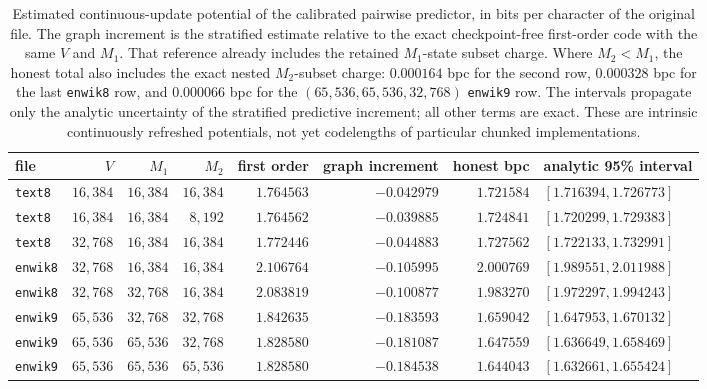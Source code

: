 \documentclass[11pt]{article}
\begin{document}
\begin{table}[ht]
\centering
\small
\setlength{\tabcolsep}{3.5pt}
\begin{tabular}{lrrrrrrl}
\toprule
file & $V$ & $M_1$ & $M_2$ & first order & graph increment & honest bpc
  & analytic 95\% interval \\
\midrule
\texttt{text8} & $16{,}384$ & $16{,}384$ & $16{,}384$
 & $1.764563$ & $-0.042979$ & $1.721584$ & $[1.716394,1.726773]$ \\
\texttt{text8} & $16{,}384$ & $16{,}384$ & $8{,}192$
 & $1.764562$ & $-0.039885$ & $1.724841$ & $[1.720299,1.729383]$ \\
\texttt{text8} & $32{,}768$ & $16{,}384$ & $16{,}384$
 & $1.772446$ & $-0.044883$ & $1.727562$ & $[1.722133,1.732991]$ \\
\texttt{enwik8} & $32{,}768$ & $16{,}384$ & $16{,}384$
 & $2.106764$ & $-0.105995$ & $2.000769$ & $[1.989551,2.011988]$ \\
\texttt{enwik8} & $32{,}768$ & $32{,}768$ & $16{,}384$
 & $2.083819$ & $-0.100877$ & $1.983270$ & $[1.972297,1.994243]$ \\
\texttt{enwik9} & $65{,}536$ & $32{,}768$ & $32{,}768$
 & $1.842635$ & $-0.183593$ & $1.659042$ & $[1.647953,1.670132]$ \\
\texttt{enwik9} & $65{,}536$ & $65{,}536$ & $32{,}768$
 & $1.828580$ & $-0.181087$ & $1.647559$ & $[1.636649,1.658469]$ \\
\texttt{enwik9} & $65{,}536$ & $65{,}536$ & $65{,}536$
 & $1.828580$ & $-0.184538$ & $1.644043$ & $[1.632661,1.655424]$ \\
\bottomrule
\end{tabular}
\caption{Estimated continuous-update potential of the calibrated pairwise
  predictor, in bits per character of the original file.  The graph increment
  is the stratified estimate relative to the exact checkpoint-free first-order
  code with the same $V$ and $M_1$.  That reference already includes the
  retained $M_1$-state subset charge.  Where $M_2<M_1$, the honest total also
  includes the exact nested $M_2$-subset charge: $0.000164$ bpc for the second
  row, $0.000328$ bpc for the last \texttt{enwik8} row, and $0.000066$ bpc
  for the $(65{,}536,65{,}536,32{,}768)$ \texttt{enwik9} row.  The intervals
  propagate only the analytic uncertainty of the stratified predictive
  increment; all other terms are exact.  These are intrinsic continuously
  refreshed potentials, not yet codelengths of particular chunked
  implementations.}
\label{tab:pairwise-potential}
\end{table}
\FloatBarrier
\end{document}
